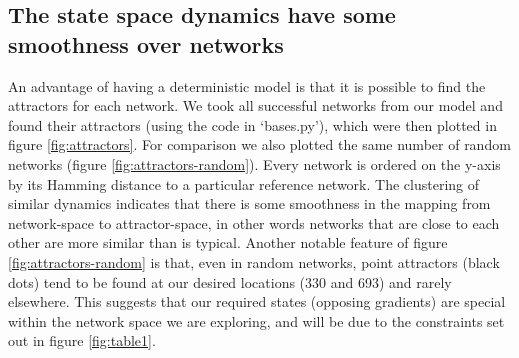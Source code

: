 \documentclass[a4paper,11pt]{article}
\begin{document}
\subsection{The state space dynamics have some smoothness over networks}
An advantage of having a deterministic model is that it is possible to find the attractors for each network. We took all successful networks from our model and found their attractors (using the code in `bases.py'), which were then plotted in figure \ref{fig:attractors}. For comparison we also plotted the same number of random networks (figure \ref{fig:attractors-random}). Every network is ordered on the y-axis by its Hamming distance to a particular reference network. The clustering of similar dynamics indicates that there is some smoothness in the mapping from network-space to attractor-space, in other words networks that are close to each other are more similar than is typical. Another notable feature of figure \ref{fig:attractors-random} is that, even in random networks, point attractors (black dots) tend to be found at our desired locations (330 and 693) and rarely elsewhere. This suggests that our required states (opposing gradients) are special within the network space we are exploring, and will be due to the constraints set out in figure \ref{fig:table1}. 
\end{document}
